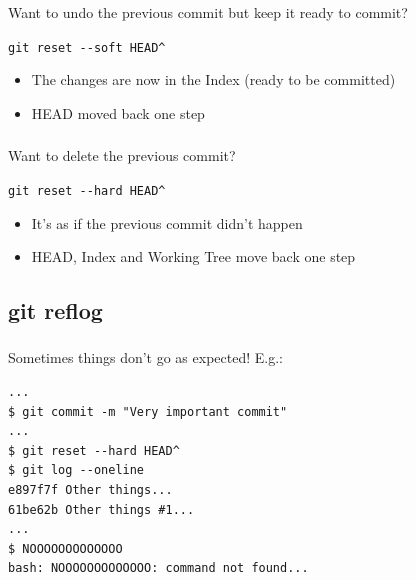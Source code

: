 
\begin{frame}
  \frametitle{\insertsubsection}

  Want to undo the previous commit but keep it ready to commit?\\
  \begin{center}
  \texttt{git reset -{}-soft HEAD\^}
  \end{center}

  \begin{itemize}
    \item The changes are now in the Index (ready to be committed)
    \item HEAD moved back one step
  \end{itemize}

\end{frame}


\begin{frame}
  \frametitle{\insertsubsection}

  Want to delete the previous commit?\\
  \begin{center}
  \texttt{git reset -{}-hard HEAD\^}
  \end{center}

  \begin{itemize}
    \item It's as if the previous commit didn't happen
    \item HEAD, Index and Working Tree move back one step
  \end{itemize}

\end{frame}


\subsection{git reflog}

\begin{frame}
  \begin{center}
    \textbf{\Huge{\insertsubsection}}
  \end{center}
\end{frame}


\begin{frame}[fragile]
  \frametitle{\insertsubsection}

  Sometimes things don't go as expected! E.g.:\\
\begin{verbatim}
...
$ git commit -m "Very important commit"
...
$ git reset --hard HEAD^
$ git log --oneline
e897f7f Other things...
61be62b Other things #1...
...
$ NOOOOOOOOOOOOO
bash: NOOOOOOOOOOOOO: command not found...
\end{verbatim}
\end{frame}

